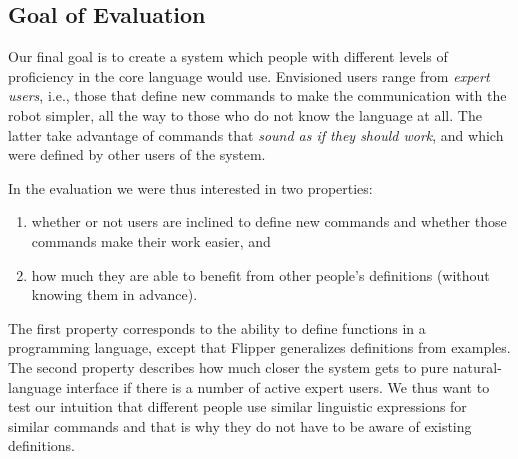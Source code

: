 \documentclass[letterpaper, 10 pt, conference]{ieeeconf}  %
\newcommand{\tool}{Flipper\xspace}
\begin{document}
\subsection{Goal of Evaluation}
Our final goal is to create a system which people with different levels of
proficiency in the core language would use. Envisioned users range from
\emph{expert users}, i.e., those that define new commands to make the
communication with the robot simpler, all the way to those who do not know the
language at all. The latter take advantage of commands that \emph{sound as if they
should work}, and which were defined by other users of the system.

In the evaluation we were thus interested in two properties:
\begin{enumerate}
	\item whether or not users are inclined to define new commands and whether
		those commands make their work easier, and
	\item how much they are able to benefit from other people's definitions
		(without knowing them in advance).
\end{enumerate}
The first property corresponds to the ability to define functions in a programming language,
except that \tool generalizes definitions from examples. The second property
describes how much closer the system gets to pure natural-language interface if
there is a number of active expert users. We thus want to test our intuition
that different people use similar linguistic expressions for similar commands
and that is why they do not have to be aware of existing definitions.
\end{document}
